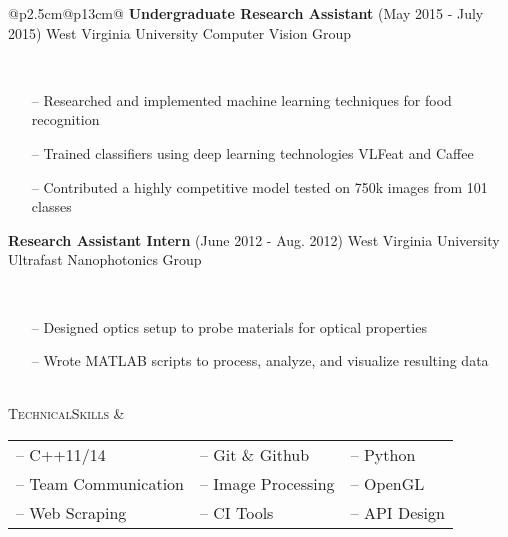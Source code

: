 \documentclass{article}
\begin{document}
\begin{tabular}{@{}p{2.5cm}@{\hspace{0.2cm}}p{13cm}@{}}
\textbf{Undergraduate Research Assistant}
\hfill\small(May 2015 - July 2015)\normalsize
\newline West Virginia University Computer Vision Group
\par\,\small
\begin{itemize}[leftmargin=*,nolistsep,noitemsep]
  \item[--]Researched and implemented machine learning techniques for food recognition
  \item[--]Trained classifiers using deep learning technologies VLFeat and Caffee
  \item[--]Contributed a highly competitive model tested on 750k images from 101 classes
\newline
\end{itemize}
\normalsize

\textbf{Research Assistant Intern}
\hfill\small(June 2012 - Aug. 2012)\normalsize
\newline West Virginia University Ultrafast Nanophotonics Group
\par\,\small
\begin{itemize}[leftmargin=*, nolistsep,noitemsep]
  \item[--]Designed optics setup to probe materials for optical properties
  \item[--]Wrote MATLAB scripts to process, analyze, and visualize resulting data
\end{itemize}
\normalsize \\


\vspace*{-2.5em}\textsc{Technical}\newline\textsc{Skills} &
\begin{tabular}{@{}lll@{}}

-- C++11/14 &
-- Git \& Github &
-- Python \\

-- Team Communication &
-- Image Processing &
-- OpenGL \\

-- Web Scraping &
-- CI Tools &
-- API Design \\


\end{tabular}
\end{tabular}
\end{document}
